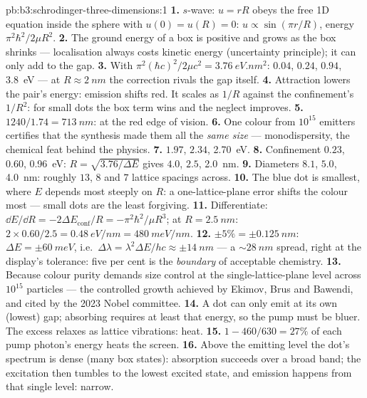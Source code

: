 \begin{solution}{pb:b3:schrodinger-three-dimensions:1}
\textbf{1.} $s$-wave: $u = rR$ obeys the free 1D equation inside the
sphere with $u(0) = u(R) = 0$: $u \propto \sin(\pi r/R)$, energy
$\pi^2\hbar^2/2\mu R^2$.
\textbf{2.} The ground energy of a box is positive and grows as the
box shrinks --- localisation always costs kinetic energy
(uncertainty principle); it can only add to the gap.
\textbf{3.} With $\pi^2(\hbar c)^2/2\mu c^2 = \qty{3.76}{eV.nm^2}$:
$0.04$, $0.24$, $0.94$, \qty{3.8}{eV} --- at $R \approx \qty{2}{nm}$
the correction rivals the gap itself.
\textbf{4.} Attraction lowers the pair's energy: emission shifts
red. It scales as $1/R$ against the confinement's $1/R^2$: for small
dots the box term wins and the neglect improves.
\textbf{5.} $1240/1.74 = \qty{713}{nm}$: at the red edge of vision.
\textbf{6.} One colour from $10^{15}$ emitters certifies that the
synthesis made them all the \emph{same size} --- monodispersity, the
chemical feat behind the physics.
\textbf{7.} $1.97$, $2.34$, \qty{2.70}{eV}.
\textbf{8.} Confinement $0.23$, $0.60$, \qty{0.96}{eV}: $R =
\sqrt{3.76/\Delta E}$ gives $4.0$, $2.5$, \qty{2.0}{nm}.
\textbf{9.} Diameters $8.1$, $5.0$, \qty{4.0}{nm}: roughly $13$,
$8$ and $7$ lattice spacings across.
\textbf{10.} The blue dot is smallest, where $E$ depends most
steeply on $R$: a one-lattice-plane error shifts the colour most ---
small dots are the least forgiving.
\textbf{11.} Differentiate: $\dd E/\dd R = -2\Delta E_{\text{conf}}/R
= -\pi^2\hbar^2/\mu R^3$; at $R = \qty{2.5}{nm}$: $2 \times 0.60/2.5
= \qty{0.48}{eV/nm} = \qty{480}{meV/nm}$.
\textbf{12.} $\pm 5\% = \pm\qty{0.125}{nm}$: $\Delta E = \pm
\qty{60}{meV}$, i.e.\ $\Delta\lambda = \lambda^2\Delta E/hc \approx
\pm\qty{14}{nm}$ --- a $\sim\qty{28}{nm}$ spread, right at the
display's tolerance: five per cent is the \emph{boundary} of
acceptable chemistry.
\textbf{13.} Because colour purity demands size control at the
single-lattice-plane level across $10^{15}$ particles --- the
controlled growth achieved by Ekimov, Brus and Bawendi, and cited by
the 2023 Nobel committee.
\textbf{14.} A dot can only emit at its own (lowest) gap; absorbing
requires at least that energy, so the pump must be bluer. The excess
relaxes as lattice vibrations: heat.
\textbf{15.} $1 - 460/630 = 27\%$ of each pump photon's energy heats
the screen.
\textbf{16.} Above the emitting level the dot's spectrum is dense
(many box states): absorption succeeds over a broad band; the
excitation then tumbles to the lowest excited state, and emission
happens from that single level: narrow.

\end{solution}
